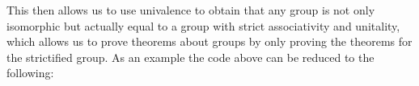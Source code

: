 \documentclass{article}
\begin{document}
This then allows us to use univalence to obtain that any group is not only isomorphic but actually equal to a group with strict associativity and unitality, which allows us to prove theorems about groups by only proving the theorems for the strictified group. As an example the code above can be reduced to the following:
\begin{code}%
\>[0]\AgdaSpace{}%
\AgdaSymbol{:}\AgdaSpace{}%
\AgdaSpace{}%
\AgdaSymbol{\{}\AgdaSymbol{\}}\AgdaSpace{}%
\AgdaSpace{}%
\AgdaSymbol{(}\AgdaSpace{}%
\AgdaSymbol{:}\AgdaSpace{}%
\AgdaSpace{}%
\AgdaSymbol{)}\AgdaSpace{}%
\AgdaSpace{}%
\AgdaSpace{}%
\<%
\\
\>[0]\AgdaSpace{}%
\AgdaSpace{}%
\AgdaSymbol{=}\AgdaSpace{}%
\AgdaSpace{}%
\AgdaSpace{}%
\AgdaSpace{}%
\AgdaSpace{}%
\AgdaSpace{}%
\AgdaSymbol{(}\AgdaSpace{}%
\AgdaSpace{}%
\AgdaSymbol{)}\AgdaSpace{}%
\AgdaSpace{}%
\AgdaSpace{}%
\AgdaSpace{}%
\AgdaSpace{}%
\AgdaSpace{}%
\<%
\\
\>[0][@{}l@{\AgdaIndent{0}}]%
\>[2]\AgdaSpace{}%
\AgdaSpace{}%
\AgdaSpace{}%
\AgdaSymbol{(}\AgdaSpace{}%
\AgdaSymbol{)}\<%
\\
%
\\[\AgdaEmptyExtraSkip]%
\>[0]\AgdaSpace{}%
\AgdaSymbol{:}\AgdaSpace{}%
\AgdaSpace{}%
\AgdaSymbol{\{}\AgdaSymbol{\}}\AgdaSpace{}%
\AgdaSpace{}%
\AgdaSymbol{(}\AgdaSpace{}%
\AgdaSymbol{:}\AgdaSpace{}%
\AgdaSpace{}%
\AgdaSymbol{)}\AgdaSpace{}%
\AgdaSpace{}%
\AgdaSpace{}%
\<%
\\
\>[0]\AgdaSpace{}%
\AgdaSpace{}%
\AgdaSymbol{=}\AgdaSpace{}%
\AgdaSpace{}%
\<%
\\
\>[0][@{}l@{\AgdaIndent{0}}]%
\>[2]%
\>[187I]\AgdaSpace{}%
\AgdaSpace{}%
\AgdaSpace{}%
\<%
\\

\end{code}
\end{document}
